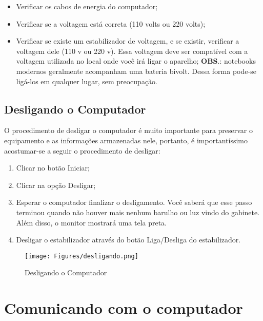 \documentclass[hidelinks,12pt]{article}
\begin{document}
\begin{itemize}
    \item Verificar os cabos de energia do computador;
    
    \item Verificar se a voltagem está correta (110 volts ou 220 volts);
    
    \item Verificar se existe um estabilizador de voltagem, e se existir, verificar a voltagem dele (110 v ou 220 v). Essa voltagem deve ser compatível com a voltagem utilizada no local onde você irá ligar o aparelho;
    \textbf{OBS}.: notebooks modernos geralmente acompanham uma bateria bivolt. Dessa forma pode-se ligá-los em qualquer lugar, sem preocupação.
\end{itemize}


\subsection{Desligando o Computador}
\label{Desligando o Computador}

O procedimento de desligar o computador é muito importante para preservar o equipamento e as informações armazenadas nele, portanto, é importantíssimo acostumar-se a seguir o procedimento de desligar:

\begin{enumerate}
	\item Clicar no botão Iniciar;

	\item Clicar na opção Desligar;

	\item Esperar o computador finalizar o desligamento. Você saberá que esse passo terminou quando não houver mais nenhum barulho ou luz vindo do gabinete. Além disso, o monitor mostrará uma tela preta.

	\item Desligar o estabilizador através do botão Liga/Desliga do estabilizador.
\end{enumerate}

\begin{figure}[!h]
	\centering
	\texttt{[image: Figures/desligando.png]}
	\caption{Desligando o Computador}
	\label{fig:desligando}
\end{figure}

\newpage

\section{Comunicando com o computador}
\label{Comunicando com o computador}
\end{document}
